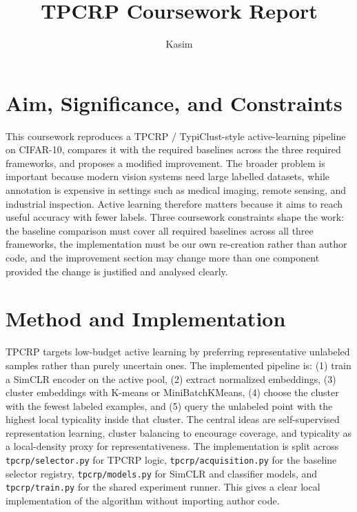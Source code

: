 \documentclass[10pt]{article}
\title{TPCRP Coursework Report}
\author{Kasim}
\date{}
\begin{document}
\maketitle

\section{Aim, Significance, and Constraints}
This coursework reproduces a TPCRP / TypiClust-style active-learning pipeline on CIFAR-10, compares it with the required baselines across the three required frameworks, and proposes a modified improvement. The broader problem is important because modern vision systems need large labelled datasets, while annotation is expensive in settings such as medical imaging, remote sensing, and industrial inspection. Active learning therefore matters because it aims to reach useful accuracy with fewer labels. Three coursework constraints shape the work: the baseline comparison must cover all required baselines across all three frameworks, the implementation must be our own re-creation rather than author code, and the improvement section may change more than one component provided the change is justified and analysed clearly.

\section{Method and Implementation}
TPCRP targets low-budget active learning by preferring representative unlabeled samples rather than purely uncertain ones. The implemented pipeline is: (1) train a SimCLR encoder on the active pool, (2) extract normalized embeddings, (3) cluster embeddings with K-means or MiniBatchKMeans, (4) choose the cluster with the fewest labeled examples, and (5) query the unlabeled point with the highest local typicality inside that cluster. The central ideas are self-supervised representation learning, cluster balancing to encourage coverage, and typicality as a local-density proxy for representativeness. The implementation is split across \texttt{tpcrp/selector.py} for TPCRP logic, \texttt{tpcrp/acquisition.py} for the baseline selector registry, \texttt{tpcrp/models.py} for SimCLR and classifier models, and \texttt{tpcrp/train.py} for the shared experiment runner. This gives a clear local implementation of the algorithm without importing author code.
\end{document}
